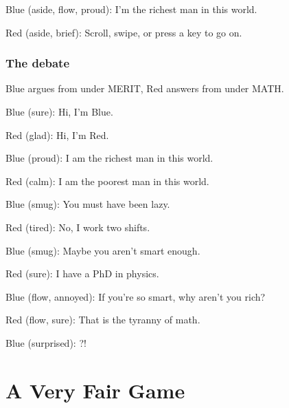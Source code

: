 Blue (aside, flow, proud): I'm the richest man in this world.

Red (aside, brief): Scroll, swipe, or press a key to go on.



\subsection{The debate}\label{act:merit-debate}


Blue argues from under MERIT, Red answers from under MATH.


Blue (sure): Hi, I'm Blue.

Red (glad): Hi, I'm Red.

Blue (proud): I am the richest man in this world.

Red (calm): I am the poorest man in this world.

Blue (smug): You must have been lazy.

Red (tired): No, I work two shifts.

Blue (smug): Maybe you aren't smart enough.

Red (sure): I have a PhD in physics.

Blue (flow, annoyed): If you’re so smart,
why aren’t you rich?

Red (flow, sure): That is the tyranny of math.

Blue (surprised): ?!



\chapter{A Very Fair Game}\label{chapter:fair-game}

